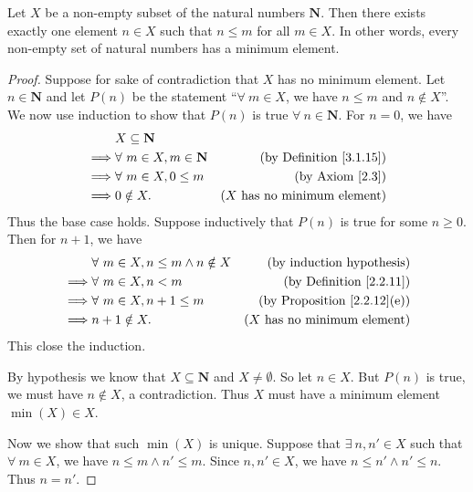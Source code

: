 \begin{proposition}\label{8.1.4}
    Let \(X\) be a non-empty subset of the natural numbers \(\mathbf{N}\).
    Then there exists exactly one element \(n \in X\) such that \(n \leq m\) for all \(m \in X\).
    In other words, every non-empty set of natural numbers has a minimum element.
\end{proposition}

\begin{proof}
    Suppose for sake of contradiction that \(X\) has no minimum element.
    Let \(n \in \mathbf{N}\) and let \(P(n)\) be the statement ``\(\forall\ m \in X\), we have \(n \leq m\) and \(n \notin X\)''.
    We now use induction to show that \(P(n)\) is true \(\forall\ n \in \mathbf{N}\).
    For \(n = 0\), we have
    \begin{align*}
                 & X \subseteq \mathbf{N}                                                     \\
        \implies & \forall\ m \in X, m \in \mathbf{N} & \text{(by Definition \ref{3.1.15})}   \\
        \implies & \forall\ m \in X, 0 \leq m         & \text{(by Axiom \ref{2.3})}           \\
        \implies & 0 \notin X.                        & \text{(\(X\) has no minimum element)}
    \end{align*}
    Thus the base case holds.
    Suppose inductively that \(P(n)\) is true for some \(n \geq 0\).
    Then for \(n + 1\), we have
    \begin{align*}
                 & \forall\ m \in X, n \leq m \land n \notin X & \text{(by induction hypothesis)}        \\
        \implies & \forall\ m \in X, n < m                     & \text{(by Definition \ref{2.2.11})}     \\
        \implies & \forall\ m \in X, n + 1 \leq m              & \text{(by Proposition \ref{2.2.12}(e))} \\
        \implies & n + 1 \notin X.                             & \text{(\(X\) has no minimum element)}
    \end{align*}
    This close the induction.

    By hypothesis we know that \(X \subseteq \mathbf{N}\) and \(X \neq \emptyset\).
    So let \(n \in X\).
    But \(P(n)\) is true, we must have \(n \notin X\), a contradiction.
    Thus \(X\) must have a minimum element \(\min(X) \in X\).

    Now we show that such \(\min(X)\) is unique.
    Suppose that \(\exists\ n, n' \in X\) such that \(\forall\ m \in X\), we have \(n \leq m \land n' \leq m\).
    Since \(n, n' \in X\), we have \(n \leq n' \land n' \leq n\).
    Thus \(n = n'\).
\end{proof}

